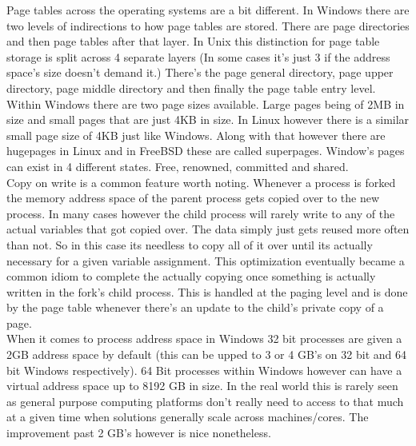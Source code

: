 \documentclass[letterpaper,10pt,draftclsnofoot,onecolumn]{IEEEtran}
\begin{document}
Page tables across the operating systems are a bit different. In Windows there are two levels of indirections to how page tables are stored. There are page directories and then page tables after that layer. In Unix this distinction for page table storage is split across 4 separate layers (In some cases it's just 3 if the address space’s size doesn’t demand it.) There's the page general directory, page upper directory, page middle directory and then finally the page table entry level. Within Windows there are two page sizes available. Large pages being of 2MB in size and small pages that are just 4KB in size. In Linux however there is a similar small page size of 4KB just like Windows. Along with that however there are hugepages in Linux and in FreeBSD these are called superpages. \cite{mccusick} Window’s pages can exist in 4 different states. Free, renowned, committed and shared.\\

Copy on write is a common feature worth noting. Whenever a process is forked the memory address space of the parent process gets copied over to the new process. In many cases however the child process will rarely write to any of the actual variables that got copied over. The data simply just gets reused more often than not. So in this case its needless to copy all of it over until its actually necessary for a given variable assignment. This optimization eventually became a common idiom to complete the actually copying once something is actually written in the fork’s child process. This is handled at the paging level and is done by the page table whenever there’s an update to the child’s private copy of a page. \cite{love}\\

When it comes to process address space in Windows 32 bit processes are given a 2GB address space by default (this can be upped to 3 or 4 GB’s on 32 bit and 64 bit Windows respectively). 64 Bit processes within Windows however can have a virtual address space up to 8192 GB in size. In the real world this is rarely seen as general purpose computing platforms don’t really need to access to that much at a given time when solutions generally scale across machines/cores. The improvement past 2 GB’s however is nice nonetheless.\\
\end{document}
